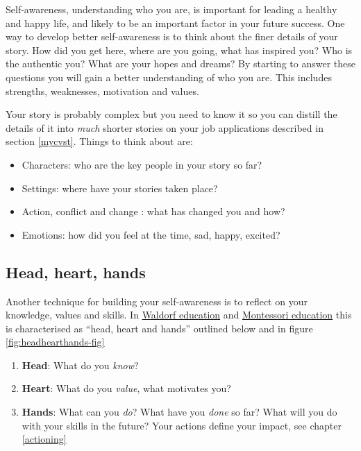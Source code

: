 \documentclass[
]{book}
\providecommand{\tightlist}{%
  \setlength{\itemsep}{0pt}\setlength{\parskip}{0pt}}
\begin{document}
Self-awareness, understanding who you are, is important for leading a healthy and happy life, and likely to be an important factor in your future success. One way to develop better self-awareness is to think about the finer details of your story. \citep{freeyourstory} How did you get here, where are you going, what has inspired you? Who is the authentic you? \citep{regrets} What are your hopes and dreams? By starting to answer these questions you will gain a better understanding of who you are. This includes strengths, weaknesses, motivation and values. \citep{parachute2020}

Your story is probably complex but you need to know it so you can distill the details of it into \emph{much} shorter stories on your job applications described in section \ref{mycvst}. Things to think about are:

\begin{itemize}
\tightlist
\item
  Characters: who are the key people in your story so far?
\item
  Settings: where have your stories taken place?
\item
  Action, conflict and change : what has changed you and how?
\item
  Emotions: how did you feel at the time, sad, happy, excited?
\end{itemize}

\hypertarget{hhh}{%
\subsection{Head, heart, hands}\label{hhh}}

Another technique for building your self-awareness is to reflect on your knowledge, values and skills. In \href{https://en.wikipedia.org/wiki/Waldorf_education}{Waldorf education} and \href{https://en.wikipedia.org/wiki/Montessori_education}{Montessori education} this is characterised as ``head, heart and hands'' outlined below and in figure \ref{fig:headhearthands-fig} \citep{headhearthands}

\begin{enumerate}
\def\labelenumi{\arabic{enumi}.}
\tightlist
\item
  \textbf{Head}: What do you \emph{know}?
\item
  \textbf{Heart}: What do you \emph{value}, what motivates you?
\item
  \textbf{Hands}: What can you \emph{do}? What have you \emph{done} so far? What will you do with your skills in the future? Your actions define your impact, see chapter \ref{actioning}
\end{enumerate}
\end{document}
